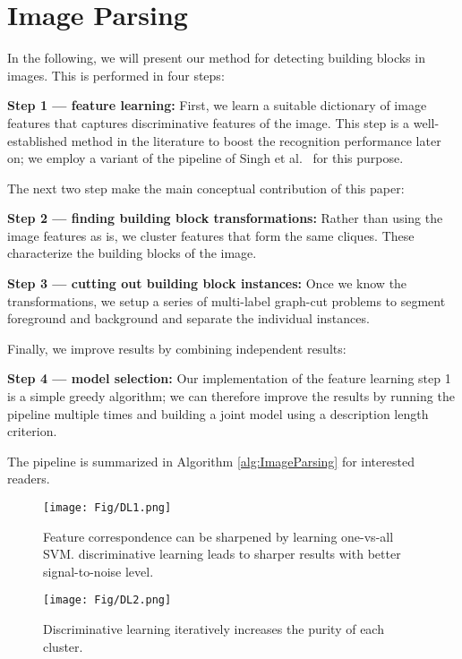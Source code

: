 \documentclass{acmtog}
\begin{document}
\section{Image Parsing}
\label{sec:ImageParsing}


	
In the following, we will present our method for detecting building blocks in images. This is performed in four steps: 

\textbf{Step 1 --- feature learning:} First, we learn a suitable dictionary of image features that captures discriminative features of the image. This step is a well-established method in the literature to boost the recognition performance later on; we employ a variant of the pipeline of Singh et al.~ for this purpose.

The next two step make the main conceptual contribution of this paper: 

\textbf{Step 2 --- finding building block transformations:} Rather than using the image features as is, we cluster features that form the same cliques. These characterize the building blocks of the image.

\textbf{Step 3 --- cutting out building block instances:} Once we know the transformations, we setup a series of multi-label graph-cut problems to segment foreground and background and separate the individual instances.

Finally, we improve results by combining independent results:

\textbf{Step 4 --- model selection:} Our implementation of the feature learning step 1 is a simple greedy algorithm; we can therefore improve the results by running the pipeline multiple times and building a joint model using a description length criterion.

The pipeline is summarized in Algorithm \ref{alg:ImageParsing} for interested readers.



\begin{figure}
	\centering
		\texttt{[image: Fig/DL1.png]}
	\caption{Feature correspondence can be sharpened by learning one-vs-all SVM. discriminative learning leads to sharper results with better signal-to-noise level.}
	\label{fig:DL1}
\end{figure}

\begin{figure}
	\centering
		\texttt{[image: Fig/DL2.png]}
	\caption{Discriminative learning iteratively increases the purity of each cluster.}
	\label{fig:DL2}
\end{figure}
\end{document}
